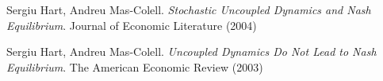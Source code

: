 \documentclass[a4paper]{article}
\theoremstyle{plain}
\theoremstyle{remark}
\begin{document}

\begin{thebibliography}{9}

    Sergiu Hart, Andreu Mas-Colell.
    \emph{Stochastic Uncoupled Dynamics and Nash Equilibrium}.
    Journal of Economic Literature (2004)
    
    Sergiu Hart, Andreu Mas-Colell.
    \emph{Uncoupled Dynamics Do Not Lead to Nash Equilibrium}.
    The American Economic Review (2003)

\end{thebibliography}
\end{document}

